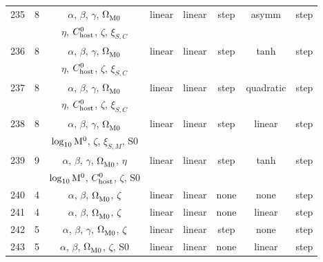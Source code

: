 \begin{longtable}{c c c c c c c c}
    235 & 8 & $\alpha$, $\beta$, $\gamma$, $\Omega_{\rm M0}^{}$ & linear & linear & step & asymm & step \\
    \multicolumn{1}{c}{} & \multicolumn{1}{c}{} & $\eta$, $C_{\rm host}^{0}$, $\zeta$, $\xi_{S,C}^{}$ & \multicolumn{1}{c}{} & \multicolumn{1}{c}{} & \multicolumn{1}{c}{} & \multicolumn{1}{c}{} & \multicolumn{1}{c}{} \\
    236 & 8 & $\alpha$, $\beta$, $\gamma$, $\Omega_{\rm M0}^{}$ & linear & linear & step & tanh & step \\
    \multicolumn{1}{c}{} & \multicolumn{1}{c}{} & $\eta$, $C_{\rm host}^{0}$, $\zeta$, $\xi_{S,C}^{}$ & \multicolumn{1}{c}{} & \multicolumn{1}{c}{} & \multicolumn{1}{c}{} & \multicolumn{1}{c}{} & \multicolumn{1}{c}{} \\
    237 & 8 & $\alpha$, $\beta$, $\gamma$, $\Omega_{\rm M0}^{}$ & linear & linear & step & quadratic & step \\
    \multicolumn{1}{c}{} & \multicolumn{1}{c}{} & $\eta$, $C_{\rm host}^{0}$, $\zeta$, $\xi_{S,C}^{}$ & \multicolumn{1}{c}{} & \multicolumn{1}{c}{} & \multicolumn{1}{c}{} & \multicolumn{1}{c}{} & \multicolumn{1}{c}{} \\
    238 & 8 & $\alpha$, $\beta$, $\gamma$, $\Omega_{\rm M0}^{}$ & linear & linear & step & linear & step \\
    \multicolumn{1}{c}{} & \multicolumn{1}{c}{} & $\log_{10}^{}{\rm M}^0$, $\zeta$, $\xi_{S,M}^{}$, S0 & \multicolumn{1}{c}{} & \multicolumn{1}{c}{} & \multicolumn{1}{c}{} & \multicolumn{1}{c}{} & \multicolumn{1}{c}{} \\
    239 & 9 & $\alpha$, $\beta$, $\gamma$, $\Omega_{\rm M0}^{}$, $\eta$ & linear & linear & step & tanh & step \\
    \multicolumn{1}{c}{} & \multicolumn{1}{c}{} & $\log_{10}^{}{\rm M}^0$, $C_{\rm host}^{0}$, $\zeta$, S0 & \multicolumn{1}{c}{} & \multicolumn{1}{c}{} & \multicolumn{1}{c}{} & \multicolumn{1}{c}{} & \multicolumn{1}{c}{} \\
    240 & 4 & $\alpha$, $\beta$, $\Omega_{\rm M0}^{}$, $\zeta$ & linear & linear & none & none & step \\
    241 & 4 & $\alpha$, $\beta$, $\Omega_{\rm M0}^{}$, $\zeta$ & linear & linear & none & linear & step \\
    242 & 5 & $\alpha$, $\beta$, $\gamma$, $\Omega_{\rm M0}^{}$, $\zeta$ & linear & linear & step & none & step \\
    243 & 5 & $\alpha$, $\beta$, $\Omega_{\rm M0}^{}$, $\zeta$, S0 & linear & linear & none & linear & step \\

\end{longtable}
